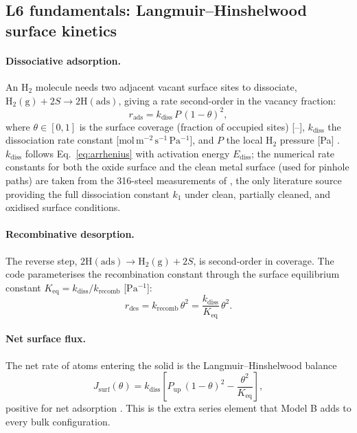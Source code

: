 \documentclass[11pt,a4paper]{article}
\newcommand{\Pup}{P_{\mathrm{up}}}
\newcommand{\Keq}{K_{\mathrm{eq}}}
\newcommand{\kdiss}{k_{\mathrm{diss}}}
\newcommand{\krec}{k_{\mathrm{recomb}}}
\begin{document}
\subsection{L6 fundamentals: Langmuir--Hinshelwood surface kinetics}

\paragraph{Dissociative adsorption.} An $\mathrm{H_2}$ molecule needs two
adjacent vacant surface sites to dissociate,
$\mathrm{H_2(g)} + 2S \rightarrow 2\mathrm{H(ads)}$, giving a rate
second-order in the vacancy fraction:
\begin{equation}
  r_{\mathrm{ads}} = \kdiss\, P\, (1-\theta)^2,
  \label{eq:ads}
\end{equation}
where $\theta \in [0,1]$ is the surface coverage (fraction of occupied
sites) [--], $\kdiss$ the dissociation rate constant
[$\mathrm{mol\,m^{-2}\,s^{-1}\,Pa^{-1}}$], and $P$ the local $\mathrm{H_2}$
pressure [Pa] \citep{pick1985,baskes1980}. $\kdiss$ follows
Eq.~\eqref{eq:arrhenius} with activation energy $E_{\mathrm{diss}}$; the
numerical rate constants for both the oxide surface and the clean metal
surface (used for pinhole paths) are taken from the 316-steel measurements of
\citet{grant1988}, the only literature source providing the full dissociation
constant $k_1$ under clean, partially cleaned, and oxidised surface
conditions.

\paragraph{Recombinative desorption.} The reverse step,
$2\mathrm{H(ads)} \rightarrow \mathrm{H_2(g)} + 2S$, is second-order in
coverage. The code parameterises the recombination constant through the
surface equilibrium constant $\Keq = \kdiss/\krec$ [$\mathrm{Pa^{-1}}$]:
\begin{equation}
  r_{\mathrm{des}} = \krec\,\theta^2 = \frac{\kdiss}{\Keq}\,\theta^2 .
  \label{eq:des}
\end{equation}

\paragraph{Net surface flux.} The net rate of atoms entering the solid is the
Langmuir--Hinshelwood balance
\begin{equation}
  J_{\mathrm{surf}}(\theta)
  = \kdiss \left[\Pup\,(1-\theta)^2 - \frac{\theta^2}{\Keq}\right],
  \label{eq:Jsurf}
\end{equation}
positive for net adsorption \citep{andrew1992}. This is the extra series
element that Model B adds to every bulk configuration.
\end{document}
